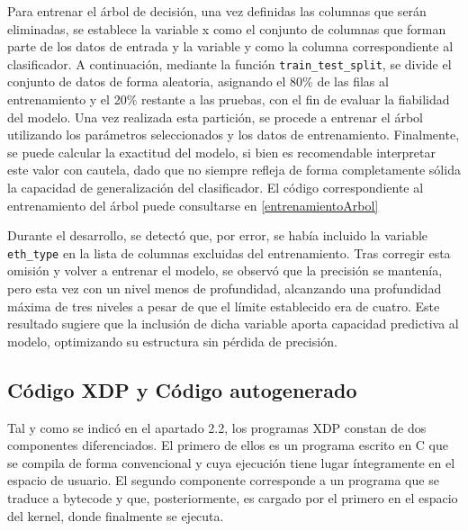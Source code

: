 Para entrenar el árbol de decisión, una vez definidas las columnas que serán eliminadas, se establece la variable x como el conjunto de columnas que forman parte de los datos de entrada y la variable y como la columna correspondiente al clasificador. A continuación, mediante la función \verb|train_test_split|, se divide el conjunto de datos de forma aleatoria, asignando el 80\% de las filas al entrenamiento y el 20\% restante a las pruebas, con el fin de evaluar la fiabilidad del modelo. Una vez realizada esta partición, se procede a entrenar el árbol utilizando los parámetros seleccionados y los datos de entrenamiento. Finalmente, se puede calcular la exactitud del modelo, si bien es recomendable interpretar este valor con cautela, dado que no siempre refleja de forma completamente sólida la capacidad de generalización del clasificador. El código correspondiente al entrenamiento del árbol puede consultarse en \ref{entrenamientoArbol}

Durante el desarrollo, se detectó que, por error, se había incluido la variable \verb|eth_type| en la lista de columnas excluidas del entrenamiento. Tras corregir esta omisión y volver a entrenar el modelo, se observó que la precisión se mantenía, pero esta vez con un nivel menos de profundidad, alcanzando una profundidad máxima de tres niveles a pesar de que el límite establecido era de cuatro. Este resultado sugiere que la inclusión de dicha variable aporta capacidad predictiva al modelo, optimizando su estructura sin pérdida de precisión.



\subsection{Código XDP y Código autogenerado}
Tal y como se indicó en el apartado 2.2, los programas XDP constan de dos componentes diferenciados. El primero de ellos es un programa escrito en C que se compila de forma convencional y cuya ejecución tiene lugar íntegramente en el espacio de usuario. El segundo componente corresponde a un programa que se traduce a bytecode y que, posteriormente, es cargado por el primero en el espacio del kernel, donde finalmente se ejecuta.

